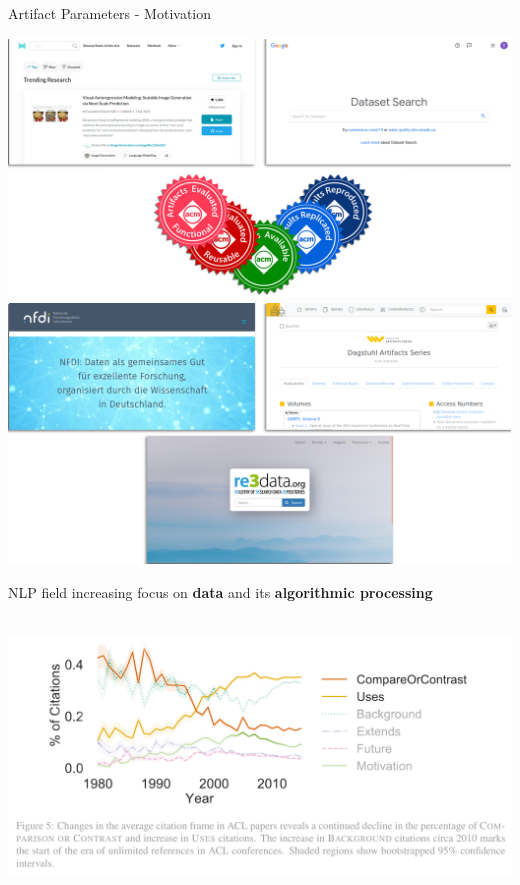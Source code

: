 \documentclass[en,16:9,smallfoot]{sdqbeamer}
\begin{document}
   \begin{frame}{Artifact Parameters - Motivation}
       \begin{overprint}
            \centering\includegraphics[width=.75\textwidth]{imgs/artifacts_en}
            \centering\includegraphics[width=.75\textwidth]{imgs/artifacts_de}
            \centering \vspace{1.25em}\begin{large}NLP field increasing focus on \textbf{data} and its \textbf{algorithmic processing}\end{large}\\\vspace{1em}\includegraphics[width=.5\textwidth]{imgs/use_on_the_rise_e}\\\begin{tiny}\end{tiny}
       \end{overprint}
   \end{frame}
\end{document}

